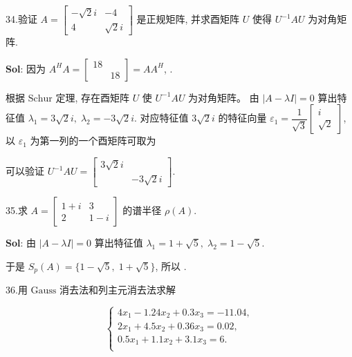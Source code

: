 
34.验证 $A=\begin{bmatrix}
    -\sqrt{2}i&-4\\
    4&\sqrt{2}i
\end{bmatrix}$ 是正规矩阵, 并求酉矩阵 $U$ 使得 $U^{-1}AU$ 为对角矩阵.


\textbf{Sol}:  因为 $A^HA=\begin{bmatrix}
    18&\\&18
\end{bmatrix}=AA^H$, 
.

根据 $\text{Schur}$ 定理, 存在酉矩阵 $U$ 使 $U^{-1}AU$ 为对角矩阵。 由 $|A-\lambda I|=0$ 算出特征值 $\lambda_1=3\sqrt{2}i,\;\lambda_2=-3\sqrt{2}i$. 对应特征值 $3\sqrt{2}i$ 的特征向量 $\varepsilon_1=\dfrac{1}{\sqrt{3}}\begin{bmatrix}
    i\\\sqrt{2}
\end{bmatrix}$, 
以 $\varepsilon_1$ 为第一列的一个酉矩阵可取为 

可以验证 $U^{-1}AU=\begin{bmatrix}
    3\sqrt{2}i&\\&-3\sqrt{2}i
\end{bmatrix}$.


\vspace{12pt}

35.求 $A=\begin{bmatrix}
    1+i&3\\
    2&1-i
\end{bmatrix}$ 的谱半径 $\rho(A)$.


\textbf{Sol}: 由 $|A-\lambda I|=0$ 算出特征值 $\lambda_1=1+\sqrt{5},\;\lambda_2=1-\sqrt{5}$. 

于是 $S_p(A)=\{1-\sqrt{5},\;1+\sqrt{5}\}$, 所以 .


\vspace{12pt}

36.用 $\text{Gauss}$ 消去法和列主元消去法求解

$$
\begin{cases}
    4x_1-1.24x_2+0.3x_3=-11.04,\\
    2x_1+4.5x_2+0.36x_3=0.02,\\
    0.5x_1+1.1x_2+3.1x_3=6.\\
\end{cases}
$$


